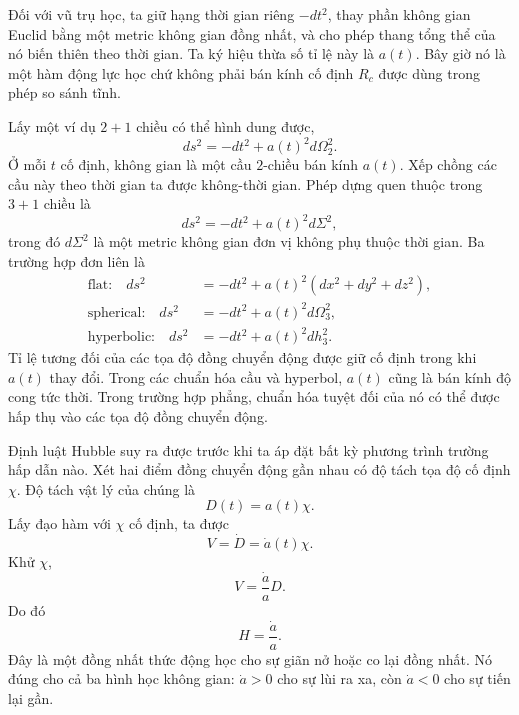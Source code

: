 Đối với vũ trụ học, ta giữ hạng thời gian riêng \(-dt^2\), thay phần không gian Euclid bằng một metric không gian đồng nhất, và cho phép thang tổng thể của nó biến thiên theo thời gian. Ta ký hiệu thừa số tỉ lệ này là \(a(t)\). Bây giờ nó là một hàm động lực học chứ không phải bán kính cố định \(R_c\) được dùng trong phép so sánh tĩnh.

Lấy một ví dụ \(2+1\) chiều có thể hình dung được,
\begin{equation}
ds^2 = -dt^2 + a(t)^2 d\Omega_2^2.
\label{eq:c03-two-plus-one}
\end{equation}
Ở mỗi \(t\) cố định, không gian là một cầu \(2\)-chiều bán kính \(a(t)\). Xếp chồng các cầu này theo thời gian ta được không-thời gian. Phép dựng quen thuộc trong \(3+1\) chiều là
\begin{equation}
ds^2 = -dt^2 + a(t)^2 d\Sigma^2,
\label{eq:c03-frw-general}
\end{equation}
trong đó \(d\Sigma^2\) là một metric không gian đơn vị không phụ thuộc thời gian. Ba trường hợp đơn liên là
\begin{align}
\text{flat:}\quad
ds^2&=-dt^2+a(t)^2\left(dx^2+dy^2+dz^2\right),\label{eq:c03-frw-flat}\\
\text{spherical:}\quad
ds^2&=-dt^2+a(t)^2d\Omega_3^2,\label{eq:c03-frw-spherical}\\
\text{hyperbolic:}\quad
ds^2&=-dt^2+a(t)^2dh_3^2.\label{eq:c03-frw-hyperbolic}
\end{align}
Tỉ lệ tương đối của các tọa độ đồng chuyển động được giữ cố định trong khi \(a(t)\) thay đổi. Trong các chuẩn hóa cầu và hyperbol, \(a(t)\) cũng là bán kính độ cong tức thời. Trong trường hợp phẳng, chuẩn hóa tuyệt đối của nó có thể được hấp thụ vào các tọa độ đồng chuyển động.

Định luật Hubble suy ra được trước khi ta áp đặt bất kỳ phương trình trường hấp dẫn nào. Xét hai điểm đồng chuyển động gần nhau có độ tách tọa độ cố định \(\chi\). Độ tách vật lý của chúng là
\begin{equation}
D(t)=a(t)\chi.
\label{eq:c03-comoving-distance}
\end{equation}
Lấy đạo hàm với \(\chi\) cố định, ta được
\begin{equation}
V=\dot D=\dot a(t)\chi.
\end{equation}
Khử \(\chi\),
\begin{equation}
V = \frac{\dot a}{a} D.
\label{eq:c03-hubble-law}
\end{equation}
Do đó
\begin{equation}
H = \frac{\dot a}{a}.
\label{eq:c03-hubble-parameter}
\end{equation}
Đây là một đồng nhất thức động học cho sự giãn nở hoặc co lại đồng nhất. Nó đúng cho cả ba hình học không gian: \(\dot a>0\) cho sự lùi ra xa, còn \(\dot a<0\) cho sự tiến lại gần.

